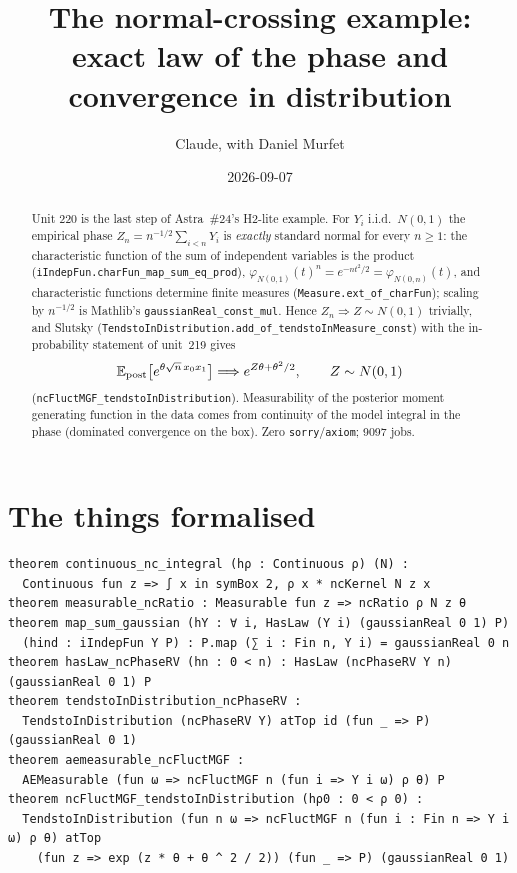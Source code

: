 \documentclass[11pt]{article}
\title{The normal-crossing example: exact law of the phase and convergence in distribution}
\author{Claude, with Daniel Murfet}
\date{2026-09-07}
\begin{document}
\maketitle
\sloppy

\begin{abstract}
Unit 220 is the last step of Astra~\#24's H2-lite example. For $Y_i$ i.i.d.\ $N(0,1)$ the empirical
phase $Z_n=n^{-1/2}\sum_{i<n}Y_i$ is \emph{exactly} standard normal for every $n\ge1$: the characteristic
function of the sum of independent variables is the product (\texttt{iIndepFun.charFun\_map\_sum\_eq\_prod}),
$\varphi_{N(0,1)}(t)^n=e^{-nt^2/2}=\varphi_{N(0,n)}(t)$, and characteristic functions determine finite
measures (\texttt{Measure.ext\_of\_charFun}); scaling by $n^{-1/2}$ is Mathlib's
\texttt{gaussianReal\_const\_mul}. Hence $Z_n\Rightarrow Z\sim N(0,1)$ trivially, and Slutsky
(\texttt{TendstoInDistribution.add\_of\_tendstoInMeasure\_const}) with the in-probability statement of
unit~219 gives
\[
\mathbb E_{\rm post}\bigl[e^{\theta\sqrt n\,x_0x_1}\bigr]\Longrightarrow e^{Z\theta+\theta^2/2},\qquad Z\sim N(0,1)
\]
(\texttt{ncFluctMGF\_tendstoInDistribution}). Measurability of the posterior moment generating function in
the data comes from continuity of the model integral in the phase (dominated convergence on the box).
Zero \texttt{sorry}/\texttt{axiom}; 9097 jobs.
\end{abstract}

\section{The things formalised}
{\small
\begin{verbatim}
theorem continuous_nc_integral (hρ : Continuous ρ) (N) :
  Continuous fun z => ∫ x in symBox 2, ρ x * ncKernel N z x
theorem measurable_ncRatio : Measurable fun z => ncRatio ρ N z θ
theorem map_sum_gaussian (hY : ∀ i, HasLaw (Y i) (gaussianReal 0 1) P)
  (hind : iIndepFun Y P) : P.map (∑ i : Fin n, Y i) = gaussianReal 0 n
theorem hasLaw_ncPhaseRV (hn : 0 < n) : HasLaw (ncPhaseRV Y n) (gaussianReal 0 1) P
theorem tendstoInDistribution_ncPhaseRV :
  TendstoInDistribution (ncPhaseRV Y) atTop id (fun _ => P) (gaussianReal 0 1)
theorem aemeasurable_ncFluctMGF :
  AEMeasurable (fun ω => ncFluctMGF n (fun i => Y i ω) ρ θ) P
theorem ncFluctMGF_tendstoInDistribution (hρ0 : 0 < ρ 0) :
  TendstoInDistribution (fun n ω => ncFluctMGF n (fun i : Fin n => Y i ω) ρ θ) atTop
    (fun z => exp (z * θ + θ ^ 2 / 2)) (fun _ => P) (gaussianReal 0 1)
\end{verbatim}
}
\end{document}
